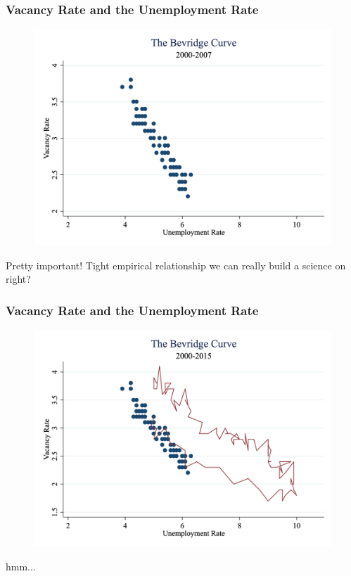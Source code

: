 \documentclass{beamer}
\begin{document}
\begin{frame}
\frametitle[alignment=center]{Vacancy Rate and the Unemployment Rate}
\begin{figure}
\centering
\includegraphics[scale=0.23]{Figures/Beverige_Initial.png}
\end{figure}
Pretty important!  Tight empirical relationship we can really build a science on right?
\end{frame}

\begin{frame}
\frametitle[alignment=center]{Vacancy Rate and the Unemployment Rate}
\begin{figure}
\centering
\includegraphics[scale=0.23]{Figures/Fig_6pt8.png}
\end{figure}
hmm...
\end{frame}
\end{document}
